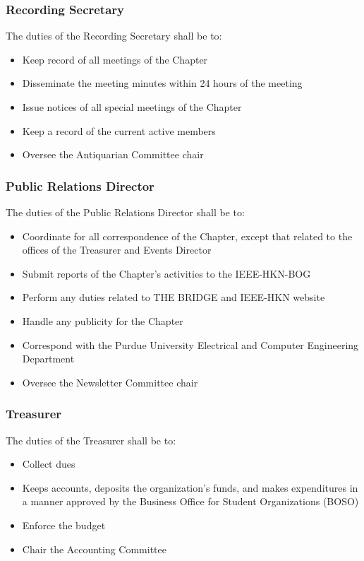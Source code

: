 \documentclass[10pt, oneside]{article}
\begin{document}
\subsubsection{Recording Secretary}
The duties of the Recording Secretary shall be to:
\begin{itemize}
\item Keep record of all meetings of the Chapter
\item Disseminate the meeting minutes within 24 hours of the meeting
\item Issue notices of all special meetings of the Chapter
\item Keep a record of the current active members
\item Oversee the Antiquarian Committee chair
\end{itemize}
\subsubsection{Public Relations Director}
The duties of the Public Relations Director shall be to:
\begin{itemize}
\item Coordinate for all correspondence of the Chapter, except that related to the offices of the Treasurer and Events Director
\item Submit reports of the Chapter’s activities to the IEEE-HKN-BOG
\item Perform any duties related to THE BRIDGE and IEEE-HKN website
\item Handle any publicity for the Chapter
\item Correspond with the Purdue University Electrical and Computer Engineering Department
\item Oversee the Newsletter Committee chair
\end{itemize}
\subsubsection{Treasurer}
The duties of the Treasurer shall be to:
\begin{itemize}
\item Collect dues
\item Keeps accounts, deposits the organization’s funds, and makes expenditures in a manner approved by the Business Office for Student Organizations (BOSO)
\item Enforce the budget
\item Chair the Accounting Committee
\end{itemize}
\end{document}
